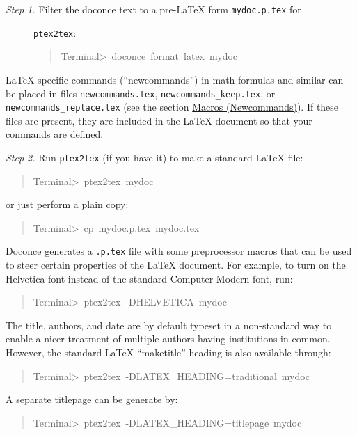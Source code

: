 \documentclass[a4paper]{article}
\begin{document}

%
\begin{description}
\item[{\emph{Step 1.} Filter the doconce text to a pre-LaTeX form \texttt{mydoc.p.tex} for}] \leavevmode 
\texttt{ptex2tex}:
%
\begin{quote}{\ttfamily \raggedright \noindent
Terminal>~doconce~format~latex~mydoc
}
\end{quote}

\end{description}

LaTeX-specific commands (``newcommands'') in math formulas and similar
can be placed in files \texttt{newcommands.tex}, \texttt{newcommands\_keep.tex}, or
\texttt{newcommands\_replace.tex} (see the section \hyperref[macros-newcommands]{Macros (Newcommands)}).
If these files are present, they are included in the LaTeX document
so that your commands are defined.

\emph{Step 2.} Run \texttt{ptex2tex} (if you have it) to make a standard LaTeX file:
%
\begin{quote}{\ttfamily \raggedright \noindent
Terminal>~ptex2tex~mydoc
}
\end{quote}

or just perform a plain copy:
%
\begin{quote}{\ttfamily \raggedright \noindent
Terminal>~cp~mydoc.p.tex~mydoc.tex
}
\end{quote}

Doconce generates a \texttt{.p.tex} file with some preprocessor macros
that can be used to steer certain properties of the LaTeX document.
For example, to turn on the Helvetica font instead of the standard
Computer Modern font, run:
%
\begin{quote}{\ttfamily \raggedright \noindent
Terminal>~ptex2tex~-DHELVETICA~mydoc
}
\end{quote}

The title, authors, and date are by default typeset in a non-standard
way to enable a nicer treatment of multiple authors having
institutions in common. However, the standard LaTeX ``maketitle'' heading
is also available through:
%
\begin{quote}{\ttfamily \raggedright \noindent
Terminal>~ptex2tex~-DLATEX\_HEADING=traditional~mydoc
}
\end{quote}

A separate titlepage can be generate by:
%
\begin{quote}{\ttfamily \raggedright \noindent
Terminal>~ptex2tex~-DLATEX\_HEADING=titlepage~mydoc
}
\end{quote}
\end{document}
